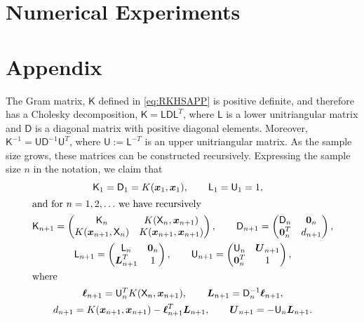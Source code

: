 \documentclass[]{mcom-l}
\theoremstyle{remark}
\newcommand{\mD}{\mathsf{D}}
\newcommand{\mK}{\mathsf{K}}
\newcommand{\mL}{\mathsf{L}}
\newcommand{\mU}{\mathsf{U}}
\newcommand{\mX}{\mathsf{X}}
\newcommand{\bzero}{\boldsymbol{0}}
\newcommand{\bx}{{\boldsymbol{x}}}
\newcommand{\vell}{{\boldsymbol{\ell}}}
\newcommand{\bL}{{\boldsymbol{L}}}
\newcommand{\bU}{{\boldsymbol{U}}}
\begin{document}
\section{Numerical Experiments}




\section*{Appendix}
The Gram matrix, $\mK$ defined in \eqref{eq:RKHSAPP} is positive definite, and therefore has a Cholesky decomposition, $\mK = \mL \mD \mL^T$, where $\mL$ is a lower unitriangular matrix and $\mD$ is a diagonal matrix with positive diagonal elements.  Moreover, $\mK^{-1} = \mU \mD^{-1} \mU^T$, where $\mU := \mL^{-T}$ is an upper unitriangular matrix. As the sample size grows, these matrices can be constructed recursively.  Expressing the sample size $n$ in the notation, we claim that 
\begin{subequations} \label{eq:cholrecurse}
\begin{gather}
\label{eq:cholrecurseA}
\mK_1  = \mD_1 = K(\bx_1,\bx_1), \qquad \mL_1 = \mU_1 = 1,  \quad \\
\intertext{and for $n = 1, 2, \ldots$ we have recursively}
\label{eq:cholrecurseB}\mK_{n+1} = \begin{pmatrix}
\mK_n & K(\mX_n, \bx_{n+1}) \\
K(\bx_{n+1}, \mX_n) & K(\bx_{n+1}, \bx_{n+1})
\end{pmatrix},
\qquad 
\mD_{n+1} = \begin{pmatrix}
\mD_n & \bzero_n \\
\bzero_n^T & d_{n+1}
\end{pmatrix},
\\
\label{eq:cholrecurseC}
\mL_{n+1} = \begin{pmatrix}
\mL_n & \bzero_n \\
\bL_{n+1}^T  & 1
\end{pmatrix},
\qquad 
\mU_{n+1} = \begin{pmatrix}
\mU_n & \bU_{n+1} \\
\bzero_n^T  & 1
\end{pmatrix}, \\
\intertext{where}
\label{eq:cholrecurseD}
\vell_{n+1} = \mU_n^T K(\mX_n, \bx_{n+1}), \qquad
\bL_{n+1} = \mD_n^{-1} \vell_{n+1}, 
\\
\label{eq:cholrecurseE}
d_{n+1} = K(\bx_{n+1}, \bx_{n+1}) - \vell^T_{n+1} \bL_{n+1}, \qquad
\bU_{n+1} = - \mU_n \bL_{n+1}.
\end{gather}
\end{subequations}
\end{document}
